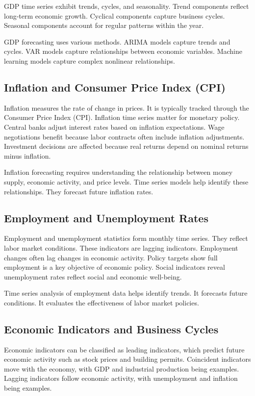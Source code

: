 GDP time series exhibit trends, cycles, and seasonality. Trend components reflect long-term economic growth. Cyclical components capture business cycles. Seasonal components account for regular patterns within the year.

GDP forecasting uses various methods. ARIMA models capture trends and cycles. VAR models capture relationships between economic variables. Machine learning models capture complex nonlinear relationships.

\subsection{Inflation and Consumer Price Index (CPI)}

Inflation measures the rate of change in prices. It is typically tracked through the Consumer Price Index (CPI). Inflation time series matter for monetary policy. Central banks adjust interest rates based on inflation expectations. Wage negotiations benefit because labor contracts often include inflation adjustments. Investment decisions are affected because real returns depend on nominal returns minus inflation.

Inflation forecasting requires understanding the relationship between money supply, economic activity, and price levels. Time series models help identify these relationships. They forecast future inflation rates.

\subsection{Employment and Unemployment Rates}

Employment and unemployment statistics form monthly time series. They reflect labor market conditions. These indicators are lagging indicators. Employment changes often lag changes in economic activity. Policy targets show full employment is a key objective of economic policy. Social indicators reveal unemployment rates reflect social and economic well-being.

Time series analysis of employment data helps identify trends. It forecasts future conditions. It evaluates the effectiveness of labor market policies.

\subsection{Economic Indicators and Business Cycles}

Economic indicators can be classified as leading indicators, which predict future economic activity such as stock prices and building permits. Coincident indicators move with the economy, with GDP and industrial production being examples. Lagging indicators follow economic activity, with unemployment and inflation being examples.

